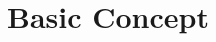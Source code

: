 \documentclass[10pt,a4paper]{article}
\begin{document}

\newpage
\tableofcontents 
\newpage
\section{Basic Concept}

\newpage


\end{document}
